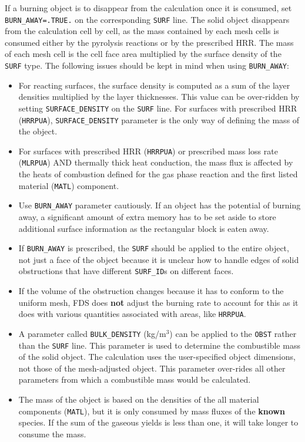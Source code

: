 \documentclass[11pt]{book}
\newcommand{\ct}{\tt\small}
\begin{document}
If a burning object is to disappear from the calculation once it is consumed, set {\ct BURN\_AWAY=.TRUE.} on the corresponding
{\ct SURF} line. The solid object disappears from the calculation cell by cell, as the mass contained by each mesh cells is consumed
either by the pyrolysis reactions or by the prescribed HRR.  The mass of each mesh cell is the cell face area multiplied by the
surface density of the {\ct SURF} type.
The following issues should be kept in mind when using {\ct BURN\_AWAY}:
\begin{itemize}
\item  For reacting surfaces, the surface density is computed as a sum of the layer densities multiplied by the layer thicknesses.
This value can be over-ridden by setting {\ct SURFACE\_DENSITY} on the {\ct SURF} line. For surfaces with prescribed HRR
({\ct HRRPUA}), {\ct SURFACE\_DENSITY} parameter is the only way of defining the mass of the object.
\item For surfaces with prescribed HRR ({\ct HRRPUA}) or prescribed mass loss rate ({\ct MLRPUA}) AND thermally thick heat conduction,
the mass flux is affected by the heats of combustion defined for the gas phase reaction and the first listed material ({\ct MATL}) component.
\item Use {\ct BURN\_AWAY} parameter cautiously. If an object has the potential of burning away, a significant
amount of extra memory has to be set aside to store additional surface information as the rectangular block is
eaten away.
\item If {\ct BURN\_AWAY} is prescribed, the {\ct SURF} should be applied to the entire object, not just a face of the object
because it is unclear how to handle edges of solid obstructions that have different {\ct SURF\_ID}s on different faces.
\item If the volume of the obstruction changes because it has to conform to the uniform mesh,
FDS does {\bf not} adjust the burning rate to account for this as it does with various quantities associated with areas,
like {\ct HRRPUA}.
\item A parameter called {\ct BULK\_DENSITY} (kg/m$^3$) can be applied to the {\ct OBST} rather than the {\ct SURF} line. This parameter is used
to determine the combustible mass of the solid object. The calculation uses the user-specified object dimensions, not those of the mesh-adjusted
object. This parameter over-rides all other parameters from which a combustible mass would be calculated.
\item The mass of the object is based on the densities of the all material components ({\ct MATL}), but it is only consumed by mass fluxes of
the {\bf known} species. If the sum of the gaseous yields is less than one, it will take longer to consume the mass.
\end{itemize}
\end{document}
